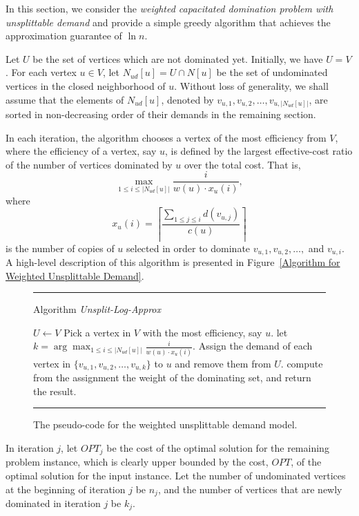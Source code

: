 \documentclass[a4paper,11pt]{article}
\theoremstyle{definition}
\begin{document}
In this section, we consider the {\em weighted capacitated
domination problem with unsplittable demand} and provide a simple
greedy algorithm that achieves the approximation guarantee of $\ln
n$.

\smallskip

Let $U$ be the set of vertices which are not dominated yet.
Initially, we have $U = V$. For each vertex $u \in V$, let
$N_{ud}[u] = U \cap N[u]$ be the set of undominated vertices in the closed neighborhood of $u$.
Without loss of generality, we shall assume that
the elements of $N_{ud}[u]$, denoted by $v_{u,1}, v_{u,2}, \ldots, v_{u,{|N_{ud}[u]|}}$, are
sorted in non-decreasing order of their demands in the remaining
section.

\smallskip

In each iteration, the algorithm chooses a vertex of the most efficiency
from $V$, where the efficiency of a vertex, say $u$, is defined by
the largest effective-cost ratio of the number of vertices dominated by $u$ over the total cost. That is, 
$$\max_{1\le i\le
|N_{ud}[u]|}\frac{i}{w(u)\cdot x_u(i)},$$ where $$x_u(i) = \left\lceil\frac{\sum_{1\le j\le i}d(v_{u,j})}{c(u)}\right\rceil$$ is
the number of copies of $u$ selected in order to dominate
$v_{u,1}, v_{u,2}, \ldots,$ and $v_{u,i}$. A high-level description of this algorithm
is presented in Figure~\ref{Algorithm for Weighted Unsplittable Demand}.

\begin{figure*}[t]
\rule{\linewidth}{0.2mm}
\medskip
{{\sc Algorithm} {\em Unsplit-Log-Approx
}}

\begin{algorithmic}[1]
\STATE $U \longleftarrow V$
    \STATE Pick a vertex in $V$ with the most efficiency, say $u$.
    \STATE let $k = \arg \max_{1\le i\le |N_{ud}[u]|}\frac{i}{w(u)\cdot x_u(i)}$.
    \STATE Assign the demand of each vertex in $\{v_{u,1}, v_{u,2}, \ldots, v_{u,k}\}$ to $u$ and remove them from $U$.
\ENDWHILE
\STATE compute from the assignment the weight of the dominating set, and return the result.

\end{algorithmic}
\rule{\linewidth}{0.2mm} 
\caption{The pseudo-code for the 
weighted unsplittable demand model.} \label{Algorithm for
Weighted Unsplittable Demand}
\end{figure*}

In iteration $j$, let $OPT_j$ be the cost of the optimal solution
for the remaining problem instance, which is clearly upper bounded
by the cost, $OPT$, of the optimal solution for the input instance.
Let the number of undominated vertices at the beginning of iteration $j$ be
$n_j$, and the number of vertices that are newly dominated in iteration $j$ be $k_j$.
\end{document}
